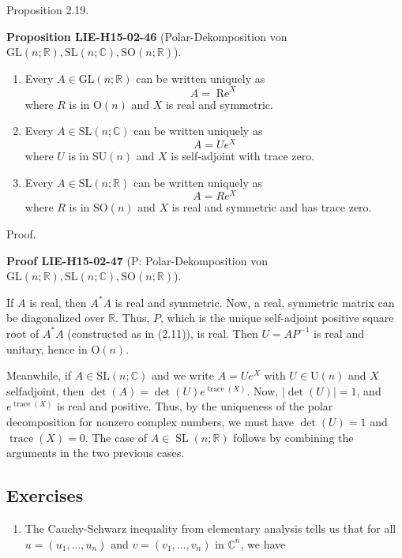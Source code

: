 \documentclass[10pt, letterpaper]{article}
\newcommand{\R}{\mathbb{R}}
\newcommand{\C}{\mathbb{C}}
\newcommand{\GL}{\mathrm{GL}}
\newcommand{\SL}{\mathrm{SL}}
\newcommand{\SO}{\mathrm{SO}}
\newcommand{\CustomHeading}[3]{%
  \par\medskip\noindent%
  \textbf{#1 #2} \textnormal{(#3)}.\enskip%
}
\newenvironment{PROP}[2]{\begin{unitbox}\CustomHeading{Proposition}{#1}{#2}}{\end{unitbox}}
\newenvironment{PROOF}[2]{\begin{unitbox}\CustomHeading{Proof}{#1}{#2}}{\end{unitbox}}
\begin{document}
Proposition 2.19.


\begin{PROP}{LIE-H15-02-46}{Polar-Dekomposition von $\GL(n;\R),\SL(n;\C),\SO(n;\R)$}
\begin{enumerate}
\item Every $A \in \mathrm{GL}(n ; \mathbb{R})$ can be written uniquely as
$$
A=\operatorname{Re}^{X}
$$
where $R$ is in $\mathrm{O}(n)$ and $X$ is real and symmetric.\\

\item Every $A \in \mathrm{SL}(n ; \mathbb{C})$ can be written uniquely as
$$
A=U e^{X}
$$
where $U$ is in $\mathrm{SU}(n)$ and $X$ is self-adjoint with trace zero.

\item Every $A \in \mathrm{SL}(n ; \mathbb{R})$ can be written uniquely as
$$
A=R e^{X}
$$
where $R$ is in $\mathrm{SO}(n)$ and $X$ is real and symmetric and has trace zero.
\end{enumerate}
\end{PROP}


Proof. 

\begin{PROOF}{LIE-H15-02-47}{P: Polar-Dekomposition von $\GL(n;\R),\SL(n;\C),\SO(n;\R)$}
If $A$ is real, then $A^{*} A$ is real and symmetric. Now, a real, symmetric matrix can be diagonalized over $\mathbb{R}$. Thus, $P$, which is the unique self-adjoint positive square root of $A^{*} A$ (constructed as in (2.11)), is real. Then $U=A P^{-1}$ is real and unitary, hence in $\mathrm{O}(n)$.

Meanwhile, if $A \in \mathrm{SL}(n ; \mathbb{C})$ and we write $A=U e^{X}$ with $U \in \mathrm{U}(n)$ and $X$ selfadjoint, then $\operatorname{det}(A)=\operatorname{det}(U) e^{\operatorname{trace}(X)}$. Now, $|\operatorname{det}(U)|=1$, and $e^{\operatorname{trace}(X)}$ is real and positive. Thus, by the uniqueness of the polar decomposition for nonzero complex numbers, we must have $\operatorname{det}(U)=1$ and $\operatorname{trace}(X)=0$. The case of $A \in \operatorname{SL}(n ; \mathbb{R})$ follows by combining the arguments in the two previous cases.
\end{PROOF}




\subsection*{Exercises}
\begin{enumerate}
  \item The Cauchy-Schwarz inequality from elementary analysis tells us that for all $u=\left(u_{1}, \ldots, u_{n}\right)$ and $v=\left(v_{1}, \ldots, v_{n}\right)$ in $\mathbb{C}^{n}$, we have
\end{enumerate}
\end{document}
